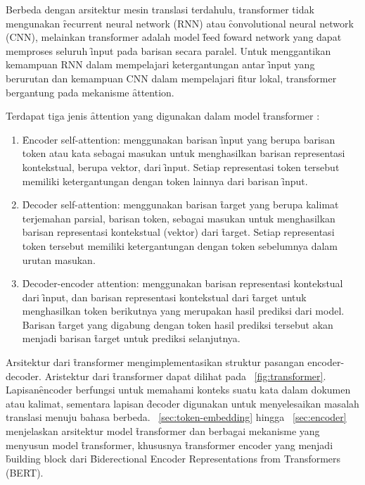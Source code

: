	Berbeda dengan arsitektur mesin translasi terdahulu, transformer tidak mengunakan \f{recurrent neural network} (RNN) atau \f{convolutional neural network} (CNN), melainkan transformer adalah model \f{feed foward network} yang dapat memproses seluruh \f{input} pada barisan secara paralel. Untuk menggantikan kemampuan RNN dalam mempelajari ketergantungan antar \f{input} yang berurutan dan kemampuan CNN dalam mempelajari fitur lokal, transformer bergantung pada mekanisme \f{attention}.

	Terdapat tiga jenis \f{attention} yang digunakan dalam model \f{transformer} \citep{transformerori}:
	\begin{enumerate}
		\item \f{Encoder self-attention}: menggunakan barisan \f{input} yang berupa barisan token atau kata sebagai masukan untuk menghasilkan barisan representasi kontekstual, berupa vektor, dari \f{input}. Setiap representasi token tersebut memiliki ketergantungan dengan token lainnya dari barisan \f{input}.
		\item \f{Decoder self-attention}: menggunakan barisan \f{target} yang berupa kalimat terjemahan parsial, barisan token, sebagai masukan untuk menghasilkan barisan representasi kontekstual (vektor) dari \f{target}. Setiap representasi token tersebut memiliki ketergantungan dengan token sebelumnya dalam urutan masukan.
		\item \f{Decoder-encoder attention}: menggunakan barisan representasi kontekstual dari \f{input}, dan barisan representasi kontekstual dari \f{target} untuk menghasilkan token berikutnya yang merupakan hasil prediksi dari model. Barisan \f{target} yang digabung dengan token hasil prediksi tersebut akan menjadi barisan \f{target} untuk prediksi selanjutnya.
	\end{enumerate}

	Arsitektur dari \f{transformer} mengimplementasikan struktur pasangan encoder-decoder. Aristektur dari \f{transformer} dapat dilihat pada \pic~\ref{fig:transformer}. Lapisan\f{encoder} berfungsi untuk memahami konteks suatu kata dalam dokumen atau kalimat, sementara lapisan \f{decoder} digunakan untuk menyelesaikan masalah translasi menuju bahasa berbeda. \sect~\ref{sec:token-embedding} hingga \sect~\ref{sec:encoder} menjelaskan arsitektur model \f{transformer} dan berbagai mekanisme yang menyusun model \f{transformer}, khususnya \f{transformer encoder} yang menjadi \f{building block} dari \f{Biderectional Encoder Representations from Transformers} (BERT).

